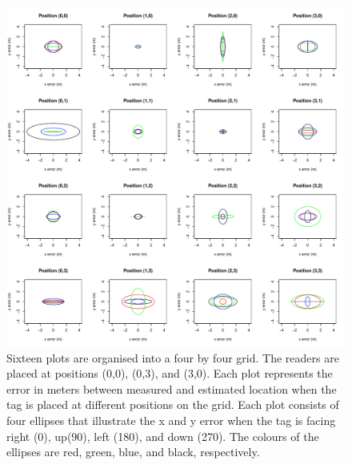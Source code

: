 \begin{figure}
	\begin{center}
		\includegraphics[width=1\textwidth]{figures/error_distance_grid}
		\caption{Sixteen plots are organised into a four by four grid. The readers are placed at positions (0,0), (0,3), and (3,0). Each plot represents the error in meters between measured and estimated location when the tag is placed at different positions on the grid. Each plot consists of four ellipses that illustrate the x and y error when the tag is facing right (0\textdegree), up(90\textdegree), left (180\textdegree), and down (270\textdegree). The colours of the ellipses are red, green, blue, and black, respectively.}
	\end{center}
\end{figure}

